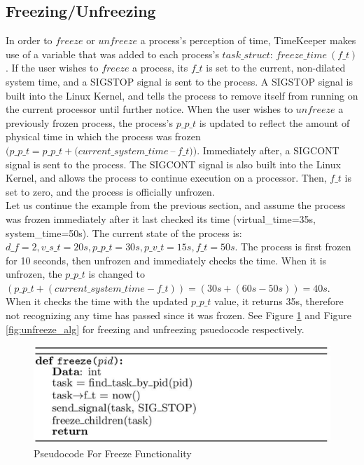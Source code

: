 \subsection{Freezing/Unfreezing}
\label{subsec:freezing_unfreezing}
        In order to $freeze$ or $unfreeze$ a process's perception of time, TimeKeeper makes use of a variable that was added to each process's $task\_struct$: $freeze\_time\ (f\_t)$. If the user wishes to $freeze$ a process, its $f\_t$ is set to the current, non-dilated system time, and a SIGSTOP signal is sent to the process. A SIGSTOP signal is built into the Linux Kernel, and tells the process to remove itself from running on the current processor until further notice. When the user wishes to $unfreeze$ a previously frozen process, the process's $p\_p\_t$ is updated to reflect the amount of physical time in which the process was frozen $(p\_p\_t =  p\_p\_t + (current\_system\_time\ $–$\ f\_t))$. Immediately after, a SIGCONT signal is sent to the process. The SIGCONT signal is also built into the Linux Kernel, and allows the process to continue execution on a processor. Then, $f\_t$ is set to zero, and the process is officially unfrozen. \\
Let us continue the example from the previous section, and assume the process was frozen immediately after it last checked its time (virtual\_time=35s, system\_time=50s). The current state of the process is: $d\_f=2, v\_s\_t=20s, p\_p\_t=30s, p\_v\_t=15s, f\_t=50s$. The process is first frozen for 10 seconds, then unfrozen and immediately checks the time. When it is unfrozen, the $p\_p\_t$ is changed to $(p\_p\_t + (current\_system\_time - f\_t)) = (30s + (60s-50s)) = 40s$. When it checks the time with the updated $p\_p\_t$ value, it returns 35s, therefore not recognizing any time has passed since it was frozen. See Figure \ref{fig:freeze_alg} and Figure \ref{fig:unfreeze_alg} for freezing and unfreezing psuedocode respectively. 
\begin{figure}[t] 
      \includegraphics[width=\textwidth]{images/freeze_alg.eps} 
    \caption{Pseudocode For Freeze Functionality} 
    \label{fig:freeze_alg} 
  \end{figure} 
